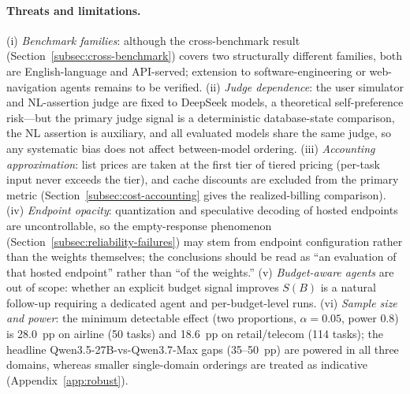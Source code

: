 \documentclass[preprint,authoryear,12pt]{elsarticle}
\begin{document}
\paragraph{Threats and limitations.} (i) \emph{Benchmark families}: although the cross-benchmark result (Section~\ref{subsec:cross-benchmark}) covers two structurally different families, both are English-language and API-served; extension to software-engineering or web-navigation agents remains to be verified. (ii) \emph{Judge dependence}: the user simulator and NL-assertion judge are fixed to DeepSeek models, a theoretical self-preference risk---but the primary judge signal is a deterministic database-state comparison, the NL assertion is auxiliary, and all evaluated models share the same judge, so any systematic bias does not affect between-model ordering. (iii) \emph{Accounting approximation}: list prices are taken at the first tier of tiered pricing (per-task input never exceeds the tier), and cache discounts are excluded from the primary metric (Section~\ref{subsec:cost-accounting} gives the realized-billing comparison). (iv) \emph{Endpoint opacity}: quantization and speculative decoding of hosted endpoints are uncontrollable, so the empty-response phenomenon (Section~\ref{subsec:reliability-failures}) may stem from endpoint configuration rather than the weights themselves; the conclusions should be read as ``an evaluation of that hosted endpoint'' rather than ``of the weights.'' (v) \emph{Budget-aware agents} are out of scope: whether an explicit budget signal improves $S(B)$ is a natural follow-up requiring a dedicated agent and per-budget-level runs. (vi) \emph{Sample size and power}: the minimum detectable effect (two proportions, $\alpha=0.05$, power 0.8) is 28.0~pp on airline (50 tasks) and 18.6~pp on retail/telecom (114 tasks); the headline Qwen3.5-27B-vs-Qwen3.7-Max gaps (35--50~pp) are powered in all three domains, whereas smaller single-domain orderings are treated as indicative (Appendix~\ref{app:robust}).

\end{document}
